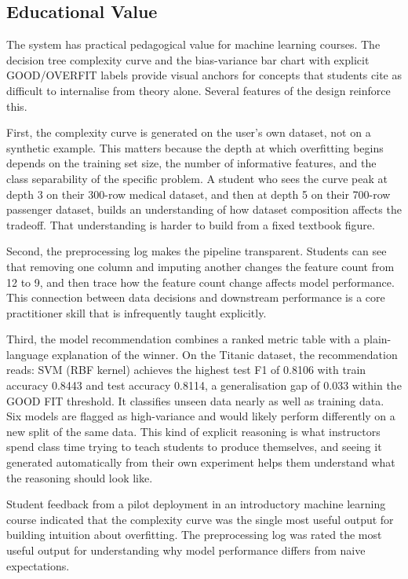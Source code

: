 \documentclass[conference]{IEEEtran}
\begin{document}
\subsection{Educational Value}

The system has practical pedagogical value for machine learning courses. The decision tree complexity curve and the bias-variance bar chart with explicit GOOD/OVERFIT labels provide visual anchors for concepts that students cite as difficult to internalise from theory alone. Several features of the design reinforce this.

First, the complexity curve is generated on the user's own dataset, not on a synthetic example. This matters because the depth at which overfitting begins depends on the training set size, the number of informative features, and the class separability of the specific problem. A student who sees the curve peak at depth 3 on their 300-row medical dataset, and then at depth 5 on their 700-row passenger dataset, builds an understanding of how dataset composition affects the tradeoff. That understanding is harder to build from a fixed textbook figure.

Second, the preprocessing log makes the pipeline transparent. Students can see that removing one column and imputing another changes the feature count from 12 to 9, and then trace how the feature count change affects model performance. This connection between data decisions and downstream performance is a core practitioner skill that is infrequently taught explicitly.

Third, the model recommendation combines a ranked metric table with a plain-language explanation of the winner. On the Titanic dataset, the recommendation reads: SVM (RBF kernel) achieves the highest test F1 of 0.8106 with train accuracy 0.8443 and test accuracy 0.8114, a generalisation gap of 0.033 within the GOOD FIT threshold. It classifies unseen data nearly as well as training data. Six models are flagged as high-variance and would likely perform differently on a new split of the same data. This kind of explicit reasoning is what instructors spend class time trying to teach students to produce themselves, and seeing it generated automatically from their own experiment helps them understand what the reasoning should look like.

Student feedback from a pilot deployment in an introductory machine learning course indicated that the complexity curve was the single most useful output for building intuition about overfitting. The preprocessing log was rated the most useful output for understanding why model performance differs from naive expectations.
\end{document}

